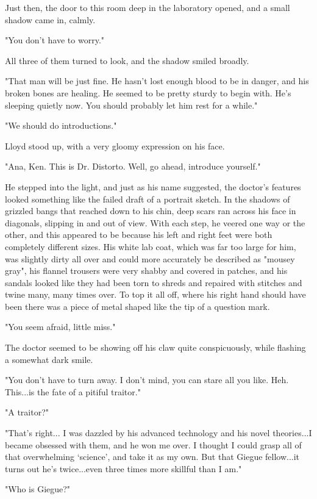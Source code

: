 \documentclass[
]{article}
\begin{document}
Just then, the door to this room deep in the laboratory opened, and a
small shadow came in, calmly.

"You don't have to worry."

All three of them turned to look, and the shadow smiled broadly.

"That man will be just fine. He hasn't lost enough blood to be in
danger, and his broken bones are healing. He seemed to be pretty sturdy
to begin with. He's sleeping quietly now. You should probably let him
rest for a while."

"We should do introductions."

Lloyd stood up, with a very gloomy expression on his face.

"Ana, Ken. This is Dr. Distorto. Well, go ahead, introduce yourself."

He stepped into the light, and just as his name suggested, the doctor's
features looked something like the failed draft of a portrait sketch. In
the shadows of grizzled bangs that reached down to his chin, deep scars
ran across his face in diagonals, slipping in and out of view. With each
step, he veered one way or the other, and this appeared to be because
his left and right feet were both completely different sizes. His white
lab coat, which was far too large for him, was slightly dirty all over
and could more accurately be described as "mousey gray", his flannel
trousers were very shabby and covered in patches, and his sandals looked
like they had been torn to shreds and repaired with stitches and twine
many, many times over. To top it all off, where his right hand should
have been there was a piece of metal shaped like the tip of a question
mark.

"You seem afraid, little miss."

The doctor seemed to be showing off his claw quite conspicuously, while
flashing a somewhat dark smile.

"You don't have to turn away. I don't mind, you can stare all you like.
Heh. This...is the fate of a pitiful traitor."

"A traitor?"

"That's right... I was dazzled by his advanced technology and his novel
theories...I became obsessed with them, and he won me over. I thought I
could grasp all of that overwhelming `science', and take it as my own.
But that Giegue fellow...it turns out he's twice...even three times more
skillful than I am."

"Who is Giegue?"
\end{document}
